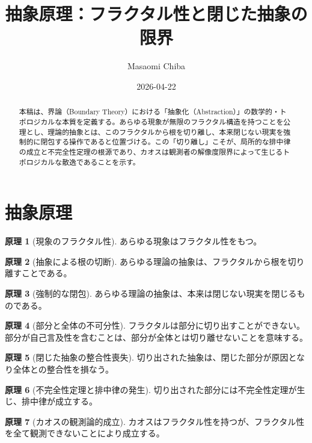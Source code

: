 \documentclass[11pt,a4paper]{article}
\theoremstyle{definition}
\newtheorem{principle}{原理}[section]
\begin{document}
\title{抽象原理：フラクタル性と閉じた抽象の限界}
\author{Masaomi Chiba}
\date{2026-04-22}
\maketitle

\begin{abstract}
本稿は、界論（Boundary Theory）における「抽象化（Abstraction）」の数学的・トポロジカルな本質を定義する。あらゆる現象が無限のフラクタル構造を持つことを公理とし、理論的抽象とは、このフラクタルから根を切り離し、本来閉じない現実を強制的に閉包する操作であると位置づける。この「切り離し」こそが、局所的な排中律の成立と不完全性定理の根源であり、カオスは観測者の解像度限界によって生じるトポロジカルな散逸であることを示す。
\end{abstract}

\section{抽象原理}

\begin{principle}[現象のフラクタル性]
あらゆる現象はフラクタル性をもつ。
\end{principle}

\begin{principle}[抽象による根の切断]
あらゆる理論の抽象は、フラクタルから根を切り離すことである。
\end{principle}

\begin{principle}[強制的な閉包]
あらゆる理論の抽象は、本来は閉じない現実を閉じるものである。
\end{principle}

\begin{principle}[部分と全体の不可分性]
フラクタルは部分に切り出すことができない。部分が自己言及性を含むことは、部分が全体とは切り離せないことを意味する。
\end{principle}

\begin{principle}[閉じた抽象の整合性喪失]
切り出された抽象は、閉じた部分が原因となり全体との整合性を損なう。
\end{principle}

\begin{principle}[不完全性定理と排中律の発生]
切り出された部分には不完全性定理が生じ、排中律が成立する。
\end{principle}

\begin{principle}[カオスの観測論的成立]
カオスはフラクタル性を持つが、フラクタル性を全て観測できないことにより成立する。
\end{principle}
\end{document}

